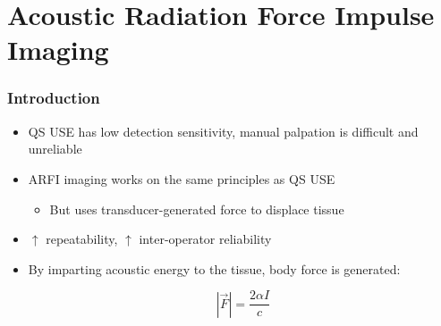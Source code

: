 \documentclass{beamer}
\begin{document}
	\section[ARFI]{Acoustic Radiation Force Impulse Imaging}
		\begin{frame}
			\frametitle{Introduction}
			\begin{itemize}
				\item QS USE has low detection sensitivity, manual palpation is difficult and unreliable
				\item \alert{ARFI} imaging works on the same principles as QS USE
				\begin{itemize}
					\item But uses \alert{transducer-generated} force to displace tissue
				\end{itemize}
				\item $\uparrow$ repeatability, $\uparrow$ inter-operator reliability
				\item By imparting acoustic energy to the tissue, body force is generated:

					\begin{equation*}
						\left|\vec{F}\right| = \frac{2\alpha I}{c}
					\end{equation*}
			\end{itemize}
		\end{frame}
\end{document}
